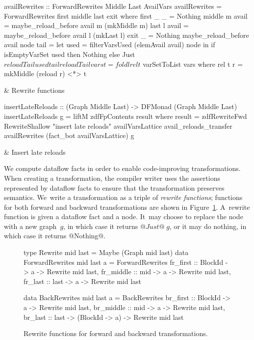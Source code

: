 \documentclass[blockstyle,preprint,nocopyrightspace]{sigplanconf}
\newcommand\figref[1]{Figure~\ref{fig:#1}}
\newcommand\figlabel[1]{\label{fig:#1}}
\begin{document}
\begin{figure*}
\begin{codetable}
\T\begin{code}
availRewrites :: ForwardRewrites Middle Last AvailVars
availRewrites = ForwardRewrites first middle last exit
  where first _ _ = Nothing
        middle m avail = maybe_reload_before avail m (mkMiddle m)
        last   l avail = maybe_reload_before avail l (mkLast l)
        exit _ = Nothing
        maybe_reload_before avail node tail =
            let used = filterVarsUsed (elemAvail avail) node
            in  if isEmptyVarSet used then Nothing
                else Just $ reloadTail used tail
        reloadTail vars t = foldl rel t $ varSetToList vars
          where rel t r = mkMiddle (reload r) <*> t
\end{code}\B
& Rewrite \mbox{functions}\\
\hline

\T\begin{code}
insertLateReloads :: (Graph Middle Last) -> DFMonad (Graph Middle Last)
insertLateReloads g = liftM zdfFpContents result
  where result = zdfRewriteFwd RewriteShallow "insert late reloads"
                               availVarsLattice avail_reloads_transfer
                               availRewrites (fact_bot availVarsLattice) g
\end{code}%
& Insert late reloads\\
\end{codetable}
\caption{Late-reload insertion, which relies on the analysis of \figref{avail}}
\figlabel{avail-rewrites}
\end{figure*}


We compute dataflow facts in order to enable code-improving
transformations.
When creating a transformation, the compiler writer uses
the assertions represented by dataflow facts to ensure that the
transformation preserves semantics.
We~write a transformation as a triple of
\emph{rewrite functions};
functions for both forward and backward transformations are shown in
\figref{rewrites}. 
%
A~rewrite function is given a dataflow fact and a node.
It~may choose to replace the node with a new graph~$g$, in which case it
returns $@Just@\;g$, or it may do nothing, in which case it returns @Nothing@.

\begin{figure}
\begin{code}
type Rewrite mid last = Maybe (Graph mid last)
data ForwardRewrites mid last a = ForwardRewrites
 {fr_first  :: BlockId -> a -> Rewrite mid last,
  fr_middle :: mid     -> a -> Rewrite mid last,
  fr_last   :: last    -> a -> Rewrite mid last} 

data BackRewrites mid last a = BackRewrites
 {br_first  :: BlockId  -> a  -> Rewrite mid last,
  br_middle :: mid      -> a  -> Rewrite mid last,
  br_last   :: last ->
               (BlockId -> a) -> Rewrite mid last} 
\end{code}
\caption{Rewrite functions for forward and backward transformations.}
\figlabel{rewrites}
\end{figure}
\end{document}
